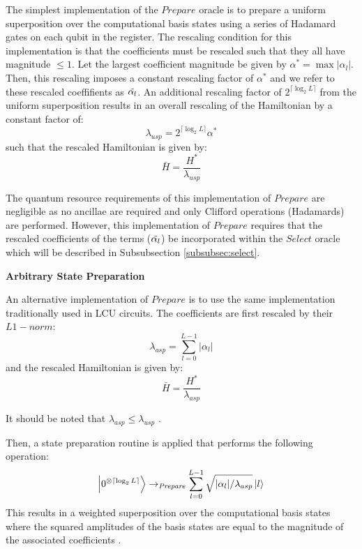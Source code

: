 The simplest implementation of the $\textit{Prepare}$ oracle is to prepare a uniform superposition over the computational basis states using a series of Hadamard gates on each qubit in the register.
The rescaling condition for this implementation is that the coefficients must be rescaled such that they all have magnitude $\leq 1$.
Let the largest coefficient magnitude be given by $\alpha^* = \max{|\alpha_l|}$.
Then, this rescaling imposes a constant rescaling factor of $\alpha^*$ and we refer to these rescaled coeffifients as $\Tilde{\alpha_l}$.
An additional rescaling factor of $2^{\lceil \log_2{L} \rceil}$ from the uniform superposition results in an overall rescaling of the Hamiltonian by a constant factor of:
\begin{equation}
    \label{usp scale}
    \lambda_{usp} = 2^{\lceil \log_2{L} \rceil} \alpha^*
\end{equation}
such that the rescaled Hamiltonian is given by:
\begin{equation}
    \label{Hbar scale}
    \bar{H} = \frac{H^*}{\lambda_{usp}}
\end{equation}

The quantum resource requirements of this implementation of $\textit{Prepare}$ are negligible as no ancillae are required and only Clifford operations (Hadamards) are performed.
However, this implementation of $\textit{Prepare}$ requires that the rescaled coefficients of the terms ($\Tilde{\alpha_l}$) be incorporated within the $\textit{Select}$ oracle which will be described in Subsubsection \ref{subsubsec:select}.

\textbf{Arbitrary State Preparation}

An alternative implementation of $\textit{Prepare}$ is to use the same implementation traditionally used in LCU circuits.
The coefficients are first rescaled by their $L1-norm$:
\begin{equation}
    \lambda_{asp} = \sum_{l=0}^{L-1} |\alpha_l|
\end{equation}
and the rescaled Hamiltonian is given by:
\begin{equation}
    \bar{H} = \frac{H^*}{\lambda_{asp}}
\end{equation}

It should be noted that $\lambda_{asp} \leq \lambda_{usp}$  .

Then, a state preparation routine is applied that performs the following operation:
\begin{equation}
    \ket{0^{\otimes \lceil \log_2{L} \rceil}} \rightarrow_{\textit{Prepare}} \sum_{l = 0}^{L-1} \sqrt{|\alpha_l| / \lambda_{asp}} \ket{l}
\end{equation}
This results in a weighted superposition over the computational basis states where the squared amplitudes of the basis states are equal to the magnitude of the associated coefficients .

